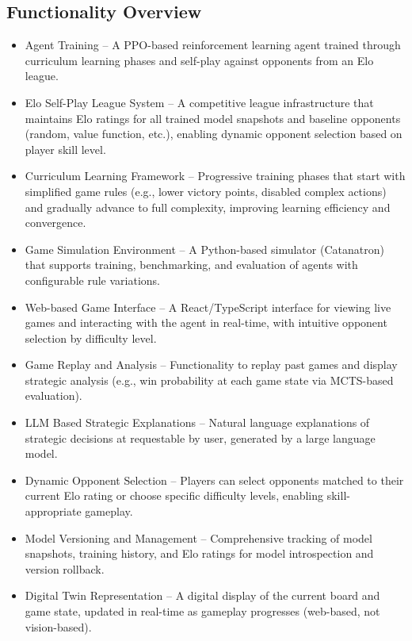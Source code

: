 \documentclass{article}
\begin{document}
\subsection{Functionality Overview}\label{subsec:functionality-overview}
\begin{itemize}
    \item {\AI{} Agent Training} – A PPO-based reinforcement learning agent trained through curriculum learning phases and self-play against opponents from an Elo league.
    \item {Elo Self-Play League System} – A competitive league infrastructure that maintains Elo ratings for all trained model snapshots and baseline opponents (random, value function, etc.), enabling dynamic opponent selection based on player skill level.
    \item {Curriculum Learning Framework} – Progressive training phases that start with simplified game rules (e.g., lower victory points, disabled complex actions) and gradually advance to full complexity, improving learning efficiency and convergence.
    \item {Game Simulation Environment} – A Python-based simulator (Catanatron) that supports training, benchmarking, and evaluation of \AI{} agents with configurable rule variations.
    \item {Web-based Game Interface} – A React/TypeScript interface for viewing live games and interacting with the \AI{} agent in real-time, with intuitive opponent selection by difficulty level.
    \item {Game Replay and Analysis} – Functionality to replay past games and display strategic analysis (e.g., win probability at each game state via MCTS-based evaluation).
    \item {LLM Based Strategic Explanations} – Natural language explanations of strategic decisions at requestable by user, generated by a large language model.
    \item {Dynamic Opponent Selection} – Players can select opponents matched to their current Elo rating or choose specific difficulty levels, enabling skill-appropriate gameplay.
    \item {Model Versioning and Management} – Comprehensive tracking of model snapshots, training history, and Elo ratings for model introspection and version rollback.
    \item {Digital Twin Representation} – A digital display of the current board and game state, updated in real-time as gameplay progresses (web-based, not vision-based).
\end{itemize}
\end{document}
